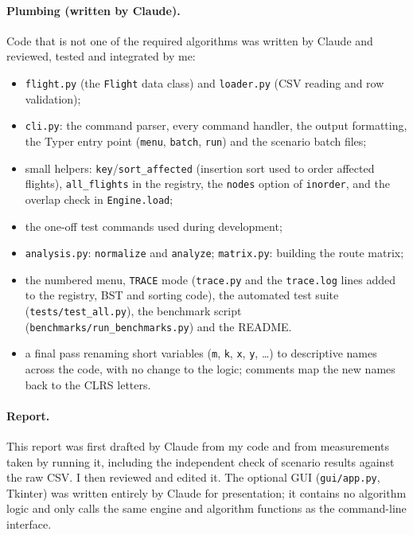 \documentclass[11pt]{article}
\begin{document}
\paragraph{Plumbing (written by Claude).}
Code that is not one of the required algorithms was written by Claude and
reviewed, tested and integrated by me:
\begin{itemize}
  \item \texttt{flight.py} (the \texttt{Flight} data class) and
  \texttt{loader.py} (CSV reading and row validation);
  \item \texttt{cli.py}: the command parser, every command handler, the
  output formatting, the Typer entry point (\texttt{menu}, \texttt{batch},
  \texttt{run}) and the scenario batch files;
  \item small helpers: \texttt{key}/\texttt{sort\_affected} (insertion sort
  used to order affected flights), \texttt{all\_flights} in the registry, the
  \texttt{nodes} option of \texttt{inorder}, and the overlap check in
  \texttt{Engine.load};
  \item the one-off test commands used during development;
  \item \texttt{analysis.py}: \texttt{normalize} and \texttt{analyze};
  \texttt{matrix.py}: building the route matrix;
  \item the numbered menu, \texttt{TRACE} mode (\texttt{trace.py} and the
  \texttt{trace.log} lines added to the registry, BST and sorting code), the
  automated test suite (\texttt{tests/test\_all.py}), the benchmark script
  (\texttt{benchmarks/run\_benchmarks.py}) and the README.
  \item a final pass renaming short variables (\texttt{m}, \texttt{k}, \texttt{x}, \texttt{y}, \ldots)
  to descriptive names across the code, with no change to the logic; comments
  map the new names back to the CLRS letters.
\end{itemize}

\paragraph{Report.}
This report was first drafted by Claude from my code and from measurements
taken by running it, including the independent check of scenario results
against the raw CSV. I then reviewed and edited it. The optional GUI (\texttt{gui/app.py},
Tkinter) was written entirely by Claude for presentation; it contains no
algorithm logic and only calls the same engine and algorithm functions as
the command-line interface.
\end{document}
